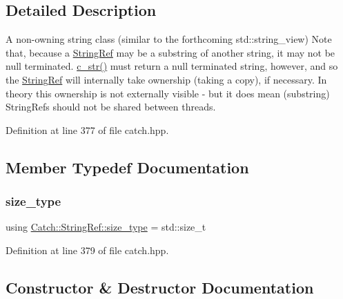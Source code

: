\subsection{Detailed Description}
A non-\/owning string class (similar to the forthcoming std\+::string\+\_\+view) Note that, because a \mbox{\hyperlink{class_catch_1_1_string_ref}{String\+Ref}} may be a substring of another string, it may not be null terminated. \mbox{\hyperlink{class_catch_1_1_string_ref_a1669cb2765e820ca258159676cbd82a5}{c\+\_\+str()}} must return a null terminated string, however, and so the \mbox{\hyperlink{class_catch_1_1_string_ref}{String\+Ref}} will internally take ownership (taking a copy), if necessary. In theory this ownership is not externally visible -\/ but it does mean (substring) String\+Refs should not be shared between threads. 

Definition at line 377 of file catch.\+hpp.



\subsection{Member Typedef Documentation}
\mbox{\label{class_catch_1_1_string_ref_a06b4db8fc82b197004291cf370b2ba7c}} 
\subsubsection{\texorpdfstring{size\+\_\+type}{size\_type}}
{\footnotesize\ttfamily using \mbox{\hyperlink{class_catch_1_1_string_ref_a06b4db8fc82b197004291cf370b2ba7c}{Catch\+::\+String\+Ref\+::size\+\_\+type}} =  std\+::size\+\_\+t}



Definition at line 379 of file catch.\+hpp.



\subsection{Constructor \& Destructor Documentation}
\mbox{\label{class_catch_1_1_string_ref_a94319c75df6542327c93a312c6a80754}} 
